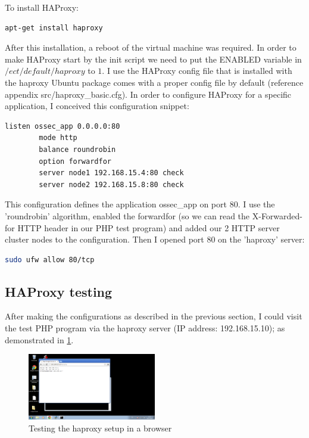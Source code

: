 \documentclass[12pt]{report}
\begin{document}
To install HAProxy:
\begin{lstlisting}[language=bash]
apt-get install haproxy
\end{lstlisting} 
After this installation, a reboot of the virtual machine was required.
In order to make HAProxy start by the init script we need to put the
ENABLED variable in $/ect/default/haproxy$ to $1$.
I use the HAProxy config file that is installed with the haproxy
Ubuntu package comes with a proper config file by default (reference appendix src/haproxy\_basic.cfg).   
In order to configure HAProxy for a specific application, I conceived
this configuration snippet:
\begin{lstlisting}[language=bash]
listen ossec_app 0.0.0.0:80
        mode http
        balance roundrobin
        option forwardfor
        server node1 192.168.15.4:80 check
        server node2 192.168.15.8:80 check
\end{lstlisting} 
This configuration defines the application ossec\_app on port 80.
I use the 'roundrobin' algorithm, enabled the forwardfor (so we can read
the X-Forwarded-for HTTP header in our PHP test program) and added our 2
HTTP server cluster nodes to the configuration.
Then I opened port 80 on the 'haproxy' server:
\begin{lstlisting}[language=bash]
  sudo ufw allow 80/tcp
\end{lstlisting} 

\subsection{HAProxy testing}
After making the configurations as described in the previous section, I could visit the test PHP program via the
haproxy server (IP address: 192.168.15.10); as demonstrated in \ref{fig:haproxy_working_browser}.

\begin{figure}[h!]
  \caption{Testing the haproxy setup in a browser}
  \label{fig:haproxy_working_browser}
  \centering
    \includegraphics[width=0.5\textwidth]{pics/haproxy_working_browser.png}
\end{figure}
\end{document}
